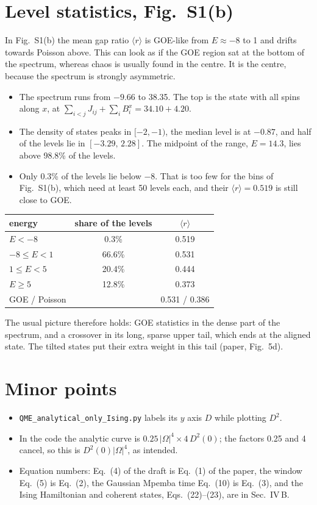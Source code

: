 \documentclass[11pt]{article}
\newcommand{\code}[1]{\texttt{#1}}
\begin{document}
\section{Level statistics, Fig.~S1(b)}\label{sec:levels}
In Fig.~S1(b) the mean gap ratio $\langle r\rangle$ is GOE-like from $E\approx-8$ to 1 and drifts towards Poisson above. This can look as if the GOE region sat at the bottom of the spectrum, whereas chaos is usually found in the centre. It is the centre, because the spectrum is strongly asymmetric.
\begin{itemize}\setlength{\itemsep}{2pt}
\item The spectrum runs from $-9.66$ to 38.35. The top is the state with all spins along $x$, at $\sum_{i<j}J_{ij}+\sum_iB^x_i=34.10+4.20$.
\item The density of states peaks in $[-2,-1)$, the median level is at $-0.87$, and half of the levels lie in $[-3.29,\,2.28]$. The midpoint of the range, $E=14.3$, lies above 98.8\% of the levels.
\item Only 0.3\% of the levels lie below $-8$. That is too few for the bins of Fig.~S1(b), which need at least 50 levels each, and their $\langle r\rangle=0.519$ is still close to GOE.
\end{itemize}

\begin{center}\small
\begin{tabular}{lcc}\toprule
energy & share of the levels & $\langle r\rangle$\\\midrule
$E<-8$ & 0.3\% & 0.519\\
$-8\le E<1$ & 66.6\% & 0.531\\
$1\le E<5$ & 20.4\% & 0.444\\
$E\ge5$ & 12.8\% & 0.373\\\midrule
GOE / Poisson & & 0.531 / 0.386\\\bottomrule
\end{tabular}
\end{center}

The usual picture therefore holds: GOE statistics in the dense part of the spectrum, and a crossover in its long, sparse upper tail, which ends at the aligned state. The tilted states put their extra weight in this tail (paper, Fig.~5d).

\section{Minor points}
\begin{itemize}\setlength{\itemsep}{2pt}
\item \code{QME\_analytical\_only\_Ising.py} labels its $y$ axis $D$ while plotting $D^2$.
\item In the code the analytic curve is $0.25\,|\Omega|^4\times4\,D^2(0)$; the factors 0.25 and 4 cancel, so this is $D^2(0)|\Omega|^4$, as intended.
\item Equation numbers: Eq.~(4) of the draft is Eq.~(1) of the paper, the window Eq.~(5) is Eq.~(2), the Gaussian Mpemba time Eq.~(10) is Eq.~(3), and the Ising Hamiltonian and coherent states, Eqs.~(22)--(23), are in Sec.~IV\,B.
\end{itemize}
\end{document}
